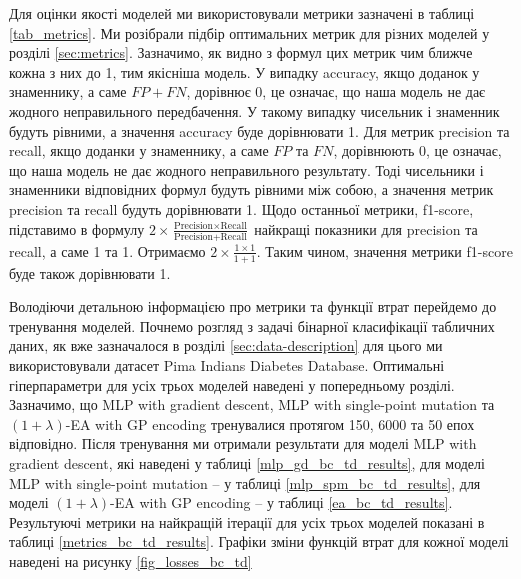 Для оцінки якості моделей ми використовували метрики зазначені в таблиці \ref{tab_metrics}. Ми розібрали підбір оптимальних метрик для різних моделей у розділі \ref{sec:metrics}. Зазначимо, як видно з формул цих метрик чим ближче кожна з них до 1, тим якісніша модель. У випадку accuracy, якщо доданок у знаменнику, а саме $FP + FN$, дорівнює 0, це означає, що наша модель не дає жодного неправильного передбачення. У такому випадку чисельник і знаменник будуть рівними, а значення accuracy буде дорівнювати 1. Для метрик precision та recall, якщо доданки у знаменнику, а саме $FP$ та $FN$, дорівнюють 0, це означає, що наша модель не дає жодного неправильного результату. Тоді чисельники і знаменники відповідних формул будуть рівними між собою, а значення метрик precision та recall будуть дорівнювати 1. Щодо останньої метрики, f1-score, підставимо в формулу $2 \times \frac{\text{Precision} \times \text{Recall}}{\text{Precision} + \text{Recall}}$ найкращі показники для precision та recall, а саме 1 та 1. Отримаємо $2 \times \frac{1 \times 1}{1 + 1}$. Таким чином, значення метрики f1-score буде також дорівнювати 1.

Володіючи детальною інформацією про метрики та функції втрат перейдемо до тренування моделей. Почнемо розгляд з задачі бінарної класифікації табличних даних, як вже зазначалося в розділі \ref{sec:data-description} для цього ми використовували датасет Pima Indians Diabetes Database. Оптимальні гіперпараметри для усіх трьох моделей наведені у попередньому розділі. Зазначимо, що MLP with gradient descent, MLP with single-point mutation та $(1+\lambda)$-EA with GP encoding тренувалися протягом 150, 6000 та 50 епох відповідно. Після тренування ми отримали результати для моделі MLP with gradient descent, які наведені у таблиці \ref{mlp_gd_bc_td_results}, для моделі MLP with single-point mutation -- у таблиці \ref{mlp_spm_bc_td_results}, для моделі $(1+\lambda)$-EA with GP encoding -- у таблиці \ref{ea_bc_td_results}. Результуючі метрики на найкращій ітерації для усіх трьох моделей показані в таблиці \ref{metrics_bc_td_results}. Графіки зміни функцій втрат для кожної моделі наведені на рисунку \ref{fig_losses_bc_td}

